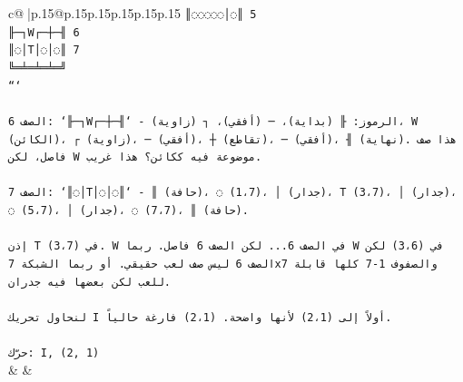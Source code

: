 \documentclass{article}
\begin{document}
{\begin{supertabular}{c@{$\;$}|p{.15\linewidth}@{}p{.15\linewidth}p{.15\linewidth}p{.15\linewidth}p{.15\linewidth}p{.15\linewidth}}
{{{\texttt{║◌◌◌◌◌│◌║ 5} \\
\texttt{╟─┐W┌─┼─╢ 6} \\
\texttt{║◌│T│◌│◌║ 7} \\
\texttt{╚═╧═╧═╧═╝} \\
\texttt{```} \\
\\ 
\texttt{الصف 6: `╟─┐W┌─┼─╢` {-} الرموز: ╟ (بداية)، ─ (أفقي)، ┐ (زاوية)، W (الكائن)، ┌ (زاوية)، ─ (أفقي)، ┼ (تقاطع)، ─ (أفقي)، ╢ (نهاية). هذا صف فاصل، لكن W موضوعة فيه ككائن؟ هذا غريب.} \\
\\ 
\texttt{الصف 7: `║◌│T│◌│◌║` {-} ║ (حافة)، ◌ (1،7)، │ (جدار)، T (3،7)، │ (جدار)، ◌ (5،7)، │ (جدار)، ◌ (7،7)، ║ (حافة).} \\
\\ 
\texttt{إذن T في (3،7). W في الصف 6... لكن الصف 6 فاصل. ربما W في (3،6) لكن الصف 6 ليس صف لعب حقيقي. أو ربما الشبكة 7x7 والصفوف 1{-}7 كلها قابلة للعب لكن بعضها فيه جدران.} \\
\\ 
\texttt{لنحاول تحريك I أولاً إلى (2،1) لأنها واضحة. (2،1) فارغة حالياً.} \\
\\ 
\texttt{حرّك: I, (2, 1)} \\
            }
        }
    }
    & & \\ \\


\end{supertabular}}
\end{document}
